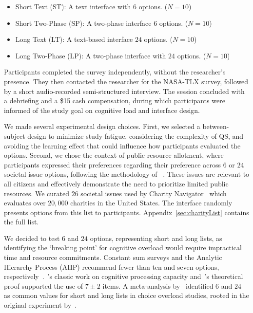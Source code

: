 \begin{itemize}
    \item Short Text (ST): A text interface with $6$ options. ($N=10$)
    \item Short Two-Phase (SP): A two-phase interface $6$ options. ($N=10$)
    \item Long Text (LT): A text-based interface $24$ options. ($N=10$)
    \item Long Two-Phase (LP): A two-phase interface with $24$ options. ($N=10$)
\end{itemize}

Participants completed the survey independently, without the researcher's presence. They then contacted the researcher for the NASA-TLX survey, followed by a short audio-recorded semi-structured interview. The session concluded with a debriefing and a \$15 cash compensation, during which participants were informed of the study goal on cognitive load and interface design.

We made several experimental design choices. First, we selected a between-subject design to minimize study fatigue, considering the complexity of QS, and avoiding the learning effect that could influence how participants evaluated the options. Second, we chose the context of public resource allotment, where participants expressed their preferences regarding their preference across $6$ or $24$ societal issue options, following the methodology of ~\textcite{chengCanShowWhat2021}. These issues are relevant to all citizens and effectively demonstrate the need to prioritize limited public resources. We curated $26$ societal issues used by Charity Navigator~\cite{CharityNavigator2023} which evaluates over $20,000$ charities in the United States. The interface randomly presents options from this list to participants. Appendix~\ref{sec:charityList} contains the full list.

We decided to test $6$ and $24$ options, representing short and long lists, as identifying the `breaking point' for cognitive overload would require impractical time and resource commitments. Constant sum surveys and the Analytic Hierarchy Process (AHP) recommend fewer than ten and seven options, respectively~\cite{moroneyQuestionnaireDesignHow2019, saatyGroupDecisionMaking2013, saatyPrinciplesAnalyticHierarchy1987}.~\textcite{millerMagicalNumberSeven1956}'s classic work on cognitive processing capacity and~\textcite{saaty2003magic}'s theoretical proof supported the use of $7\pm2$ items. A meta-analysis by~\textcite{chernevChoiceOverloadConceptual2015} identified $6$ and $24$ as common values for short and long lists in choice overload studies, rooted in the original experiment by~\textcite{iyengarWhenChoiceDemotivating2000}.

